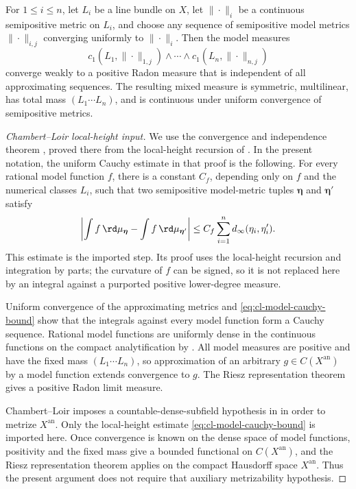 \begin{theorem}\label{thm:cl-continuous-extension}
For $1\leq i\leq n$, let $L_i$ be a line bundle on $X$, let
$\|\cdot\|_i$ be a continuous semipositive metric on $L_i$, and choose
any sequence of semipositive model metrics $\|\cdot\|_{i,j}$ converging
uniformly to $\|\cdot\|_i$. Then the model measures
\[
 c_1(L_1,\|\cdot\|_{1,j})\wedge\cdots\wedge
 c_1(L_n,\|\cdot\|_{n,j})
\]
converge weakly to a positive Radon measure that is independent of all
approximating sequences. The resulting mixed measure is symmetric,
multilinear, has total mass $(L_1\cdots L_n)$, and is continuous under
uniform convergence of semipositive metrics.
\end{theorem}
\begin{proof}[Chambert--Loir local-height input]
We use the convergence and independence theorem
\cite[Proposition~2.7]{CL06}, proved there from the local-height recursion of
\cite[\S\S2.3--2.4]{CL06}.  In the present notation, the uniform Cauchy
estimate in that proof is the
following.  For every rational model function $f$, there is a constant
$C_f$, depending only on $f$ and the numerical classes $L_i$, such
that two semipositive model-metric tuples $\boldsymbol\eta$ and
$\boldsymbol\eta'$ satisfy
\begin{equation}\label{eq:cl-model-cauchy-bound}
 \left|\int f\,\rd\mu_{\boldsymbol\eta}
       -\int f\,\rd\mu_{\boldsymbol\eta'}\right|
 \le C_f\sum_{i=1}^n d_\infty(\eta_i,\eta_i').
\end{equation}
This estimate is the imported step.  Its proof uses the local-height
recursion and integration by parts; the curvature of $f$ can be signed,
so it is not replaced here by an integral against a purported positive
lower-degree measure.

Uniform convergence of the approximating metrics and
\eqref{eq:cl-model-cauchy-bound} show that the integrals against every model
function form a Cauchy sequence.  Rational model functions are uniformly
dense in the continuous functions on the compact analytification by
.  All model measures are positive and have
the fixed mass $(L_1\cdots L_n)$, so approximation of an arbitrary
$g\in C(X^{\mathrm{an}})$ by a model function extends convergence to $g$.
The Riesz representation theorem gives a positive Radon limit measure.

Chambert--Loir imposes a countable-dense-subfield hypothesis in
\cite[\S2]{CL06} in order to metrize $X^{\mathrm{an}}$. Only the
local-height estimate \eqref{eq:cl-model-cauchy-bound} is imported here.
Once convergence is known on the dense space of model functions, positivity
and the fixed mass give a bounded functional on
$C(X^{\mathrm{an}})$, and the Riesz representation theorem applies on the
compact Hausdorff space $X^{\mathrm{an}}$. Thus the present argument does
not require that auxiliary metrizability hypothesis.


\end{proof}
